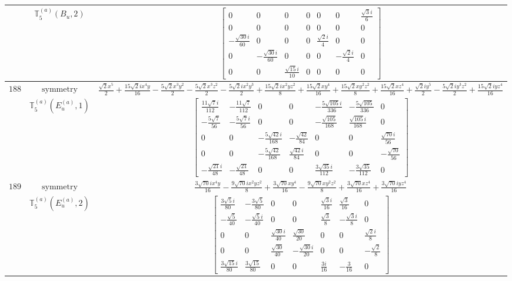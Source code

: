 \documentclass[fleqn,8pt,landscape]{jsarticle}
\begin{document}
\begin{longtable}{ccc}
$  $ & $ \mathbb{T}_{5}^{(a)}(B_{u},2) $ & $ \begin{bmatrix} 0 & 0 & 0 & 0 & 0 & 0 & \frac{\sqrt{3} i}{6} \\ 0 & 0 & 0 & 0 & 0 & 0 & 0 \\ - \frac{\sqrt{30} i}{60} & 0 & 0 & 0 & \frac{\sqrt{2} i}{4} & 0 & 0 \\ 0 & - \frac{\sqrt{30} i}{60} & 0 & 0 & 0 & - \frac{\sqrt{2} i}{4} & 0 \\ 0 & 0 & \frac{\sqrt{15} i}{10} & 0 & 0 & 0 & 0 \end{bmatrix} $ \\ \hline
$ 188 $ & $ \text{symmetry} $ & $ \frac{\sqrt{2} x^{5}}{2} + \frac{15 \sqrt{2} i x^{4} y}{16} - \frac{5 \sqrt{2} x^{3} y^{2}}{2} - \frac{5 \sqrt{2} x^{3} z^{2}}{2} - \frac{5 \sqrt{2} i x^{2} y^{3}}{2} + \frac{15 \sqrt{2} i x^{2} y z^{2}}{8} + \frac{15 \sqrt{2} x y^{4}}{16} + \frac{15 \sqrt{2} x y^{2} z^{2}}{8} + \frac{15 \sqrt{2} x z^{4}}{16} + \frac{\sqrt{2} i y^{5}}{2} - \frac{5 \sqrt{2} i y^{3} z^{2}}{2} + \frac{15 \sqrt{2} i y z^{4}}{16} $ \\
$  $ & $ \mathbb{T}_{5}^{(a)}(E_{u}^{(a)},1) $ & $ \begin{bmatrix} \frac{11 \sqrt{7} i}{112} & - \frac{11 \sqrt{7}}{112} & 0 & 0 & - \frac{5 \sqrt{105} i}{336} & - \frac{5 \sqrt{105}}{336} & 0 \\ - \frac{5 \sqrt{7}}{56} & - \frac{5 \sqrt{7} i}{56} & 0 & 0 & - \frac{\sqrt{105}}{168} & \frac{\sqrt{105} i}{168} & 0 \\ 0 & 0 & - \frac{5 \sqrt{42} i}{168} & - \frac{\sqrt{42}}{84} & 0 & 0 & \frac{\sqrt{70} i}{56} \\ 0 & 0 & - \frac{5 \sqrt{42}}{168} & \frac{\sqrt{42} i}{84} & 0 & 0 & - \frac{\sqrt{70}}{56} \\ - \frac{\sqrt{21} i}{48} & - \frac{\sqrt{21}}{48} & 0 & 0 & \frac{3 \sqrt{35} i}{112} & - \frac{3 \sqrt{35}}{112} & 0 \end{bmatrix} $ \\ \hline
$ 189 $ & $ \text{symmetry} $ & $ \frac{3 \sqrt{70} i x^{4} y}{16} - \frac{9 \sqrt{70} i x^{2} y z^{2}}{8} + \frac{3 \sqrt{70} x y^{4}}{16} - \frac{9 \sqrt{70} x y^{2} z^{2}}{8} + \frac{3 \sqrt{70} x z^{4}}{16} + \frac{3 \sqrt{70} i y z^{4}}{16} $ \\
$  $ & $ \mathbb{T}_{5}^{(a)}(E_{u}^{(a)},2) $ & $ \begin{bmatrix} \frac{3 \sqrt{5} i}{80} & - \frac{3 \sqrt{5}}{80} & 0 & 0 & \frac{\sqrt{3} i}{16} & \frac{\sqrt{3}}{16} & 0 \\ - \frac{\sqrt{5}}{40} & - \frac{\sqrt{5} i}{40} & 0 & 0 & \frac{\sqrt{3}}{8} & - \frac{\sqrt{3} i}{8} & 0 \\ 0 & 0 & \frac{\sqrt{30} i}{40} & \frac{\sqrt{30}}{20} & 0 & 0 & \frac{\sqrt{2} i}{8} \\ 0 & 0 & \frac{\sqrt{30}}{40} & - \frac{\sqrt{30} i}{20} & 0 & 0 & - \frac{\sqrt{2}}{8} \\ \frac{3 \sqrt{15} i}{80} & \frac{3 \sqrt{15}}{80} & 0 & 0 & \frac{3 i}{16} & - \frac{3}{16} & 0 \end{bmatrix} $ \\ \hline

\end{longtable}
\end{document}
